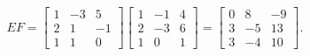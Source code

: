 \documentclass[12pt]{article}
\begin{document}
		\begin{align*}
		EF = \left[\begin{matrix}1 & -3 & 5\\2 & 1 & -1\\1 & 1 & 0\end{matrix}\right] \left[\begin{matrix}1 & -1 & 4\\2 & -3 & 6\\1 & 0 & 1\end{matrix}\right] = \left[\begin{matrix}0 & 8 & -9\\3 & -5 & 13\\3 & -4 & 10\end{matrix}\right] .
		\end{align*}
		
	\newpage
	
\end{document}
